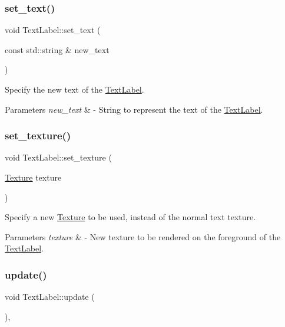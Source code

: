 \subsubsection{\texorpdfstring{set\+\_\+text()}{set\_text()}}
{\footnotesize\ttfamily void Text\+Label\+::set\+\_\+text (\begin{DoxyParamCaption}\item[{const std\+::string \&}]{new\+\_\+text }\end{DoxyParamCaption})}

Specify the new text of the \mbox{\hyperlink{class_text_label}{Text\+Label}}. 
\begin{DoxyParams}{Parameters}
{\em new\+\_\+text} & -\/ String to represent the text of the \mbox{\hyperlink{class_text_label}{Text\+Label}}. \\
\hline
\end{DoxyParams}
\mbox{\label{class_text_label_ae39dffa6e09e0ef03f2ef8f980e47076}} 
\subsubsection{\texorpdfstring{set\+\_\+texture()}{set\_texture()}}
{\footnotesize\ttfamily void Text\+Label\+::set\+\_\+texture (\begin{DoxyParamCaption}\item[{\mbox{\hyperlink{class_texture}{Texture}}}]{texture }\end{DoxyParamCaption})}

Specify a new \mbox{\hyperlink{class_texture}{Texture}} to be used, instead of the normal text texture. 
\begin{DoxyParams}{Parameters}
{\em texture} & -\/ New texture to be rendered on the foreground of the \mbox{\hyperlink{class_text_label}{Text\+Label}}. \\
\hline
\end{DoxyParams}
\mbox{\label{class_text_label_a350a9edc23e4d2a53374fddc5ddc61cc}} 
\subsubsection{\texorpdfstring{update()}{update()}}
{\footnotesize\ttfamily void Text\+Label\+::update (\begin{DoxyParamCaption}{ }\end{DoxyParamCaption})\hspace{0.3cm}{\ttfamily [override]}, {\ttfamily [virtual]}}

